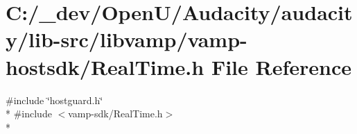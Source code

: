 \hypertarget{vamp-hostsdk_2_real_time_8h}{}\section{C\+:/\+\_\+dev/\+Open\+U/\+Audacity/audacity/lib-\/src/libvamp/vamp-\/hostsdk/\+Real\+Time.h File Reference}
\label{vamp-hostsdk_2_real_time_8h}
{\ttfamily \#include \char`\"{}hostguard.\+h\char`\"{}}\\*
{\ttfamily \#include $<$vamp-\/sdk/\+Real\+Time.\+h$>$}\\*
